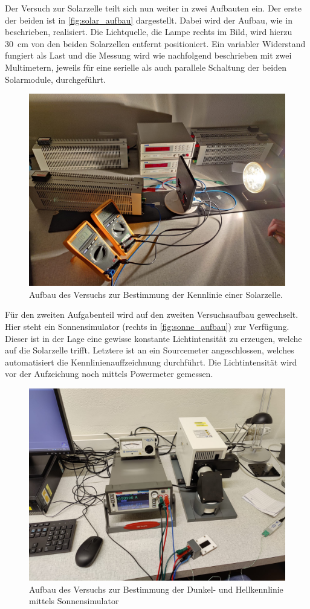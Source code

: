 \documentclass[english, ngerman]{scrartcl}
\begin{document}
Der Versuch zur Solarzelle teilt sich nun weiter in zwei Aufbauten ein. Der erste der beiden ist in \autoref{fig:solar_aufbau} dargestellt. Dabei wird der Aufbau, wie in \cite{ref:angabe_solar} beschrieben, realisiert. Die Lichtquelle, die Lampe rechts im Bild, wird hierzu \SI{30}{cm} von den beiden Solarzellen entfernt positioniert. Ein variabler Widerstand fungiert als Last und die Messung wird wie nachfolgend beschrieben mit zwei Multimetern, jeweils für eine serielle als auch parallele Schaltung der beiden Solarmodule, durchgeführt.
%
\begin{figure}[H]
    \centering
    \begin{samepage}
        \includegraphics[width=0.6\linewidth]{fig/Aufbau_solar.jpeg}
        \caption[Aufbau Kennlinie Solarzelle Lampe]{Aufbau des Versuchs zur Bestimmung der Kennlinie einer Solarzelle.}
        \label{fig:solar_aufbau}
    \end{samepage}
\end{figure}
%
Für den zweiten Aufgabenteil wird auf den zweiten Versuchsaufbau gewechselt. Hier steht ein Sonnensimulator (rechts in \autoref{fig:sonne_aufbau}) zur Verfügung. Dieser ist in der Lage eine gewisse konstante Lichtintensität zu erzeugen, welche auf die Solarzelle trifft. Letztere ist an ein Sourcemeter angeschlossen, welches automatisiert die Kennlinienauffzeichnung durchführt. Die Lichtintensität wird vor der Aufzeichung noch mittels Powermeter gemessen.
%
\begin{figure}[H]
    \centering
    \begin{samepage}
        \includegraphics[width=0.6\linewidth]{fig/Aufbau_Sonnensimulator.jpeg}
        \caption[Aufbau Hell- und Dunkelkennlinie Solarzelle Sonnensimulator]{Aufbau des Versuchs zur Bestimmung der Dunkel- und Hellkennlinie mittels Sonnensimulator}
        \label{fig:sonne_aufbau}
    \end{samepage}
\end{figure}
\end{document}
